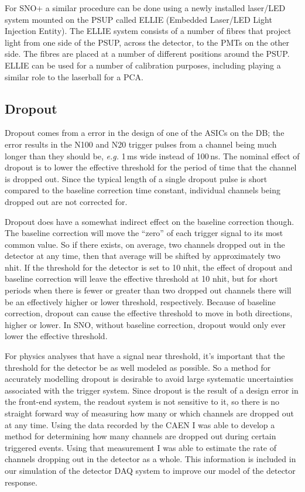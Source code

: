 For SNO+ a similar procedure can be done using a newly installed laser/LED system
mounted on the PSUP called ELLIE (Embedded Laser/LED Light Injection Entity).
The ELLIE system consists of a number of fibres that project light from one
side of the PSUP, across the detector, to the PMTs on the other side.
The fibres are placed at a number of different positions around the PSUP\@.
ELLIE can be used for a number of calibration purposes, including playing a
similar role to the laserball for a PCA\@.

\subsection{Dropout}
\label{sec:dropout}
Dropout comes from a error in the design of one of the
ASICs on the DB\@;
the error results in the N100 and N20 trigger pulses from
a channel being much longer than they should be, \textit{e.g.} 1\,ms wide
instead of 100\,ns.
The nominal effect of dropout is to lower the effective threshold for the period
of time that the channel is dropped out.
Since the typical length of a single dropout pulse is short compared to the
baseline correction time constant, individual channels being dropped out
are not corrected for.

Dropout does have a somewhat indirect effect on the baseline correction though.
The baseline correction will move the ``zero'' of each trigger signal to
its most common value.
So if there exists, on average, two channels dropped out
in the detector at any time, then that average will be shifted by approximately
two nhit.
If the threshold for the detector is set to 10 nhit,
the effect of dropout and baseline correction will leave the effective threshold
at 10 nhit, but for short periods when there is fewer or greater than two dropped out
channels there will be an effectively higher or lower threshold, respectively.
Because of baseline correction, dropout can cause the effective threshold to move
in both directions, higher or lower.
In SNO, without baseline correction, dropout would only ever lower the effective threshold.


For physics analyses that have a signal near threshold, it's important that
the threshold for the detector be as well modeled as possible.
So a method for accurately modelling dropout is desirable to avoid large
systematic uncertainties associated with the trigger system.
Since dropout is the result of a design error in the front-end system, the readout system
is not sensitive to it, so there is no straight forward way of measuring how many
or which channels are dropped out at any time.
Using the data recorded by the CAEN I was able to develop a method for determining
how many channels are dropped out during certain triggered events.
Using that measurement I was able to estimate the rate of channels dropping out
in the detector as a whole.
This information is included in our simulation of the detector DAQ system to improve
our model of the detector response.

